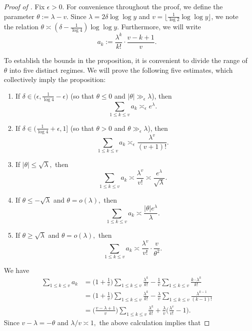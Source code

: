 \documentclass{amsart}
\theoremstyle{definition}
\numberwithin{equation}{section}
\newcommand{\density}{\delta}
\begin{document}
	\begin{proof}[Proof of ]
		Fix $\epsilon > 0$. For convenience throughout the proof, we define the parameter $\theta := \lambda - v$. Since $\lambda = 2\density \log \log y$ and $v = \lfloor\frac{1}{\log 2}\log \log y\rfloor$, we note the relation $\theta \asymp (\density - \frac{1}{\log 4})\log \log y$. Furthermore, we will write
		$$a_k := \frac{\lambda^k}{k!}\cdot \frac{v-k+1}{v}.$$
		
		To establish the bounds in the proposition, it is convenient to divide the range of $\theta$ into five distinct regimes. We will prove the following five estimates, which collectively imply the proposition:
		\begin{enumerate}[label=(\roman*)]
			\item If $\density \in \big(\epsilon,\frac{1}{\log 4} - \epsilon\big)$ (so that $\theta \leq 0$ and $|\theta| \gg_\epsilon \lambda$), then $$\sum_{1 \leq k \leq v} a_k \asymp_{\epsilon} e^\lambda.$$
			\item If $\density \in \big(\frac{1}{\log 4} + \epsilon,1\big]$ (so that $\theta > 0$ and $\theta \gg_\epsilon \lambda$), then $$\sum_{1 \leq k \leq v} a_k \asymp_{\epsilon} \frac{\lambda^v}{(v+1)!}.$$
			\item If $|\theta|  \le \sqrt{\lambda},$ then $$\sum_{1 \leq k \leq v} a_k \asymp \frac{\lambda^v}{v!} \asymp \frac{e^\lambda}{\sqrt{\lambda}}.$$
			\item If $\theta \leq -\sqrt{\lambda}$ and $\theta = o(\lambda),$ then $$\sum_{1 \leq k \leq v} a_k \asymp \frac{|\theta| e^\lambda}{\lambda}.$$
			\item If $\theta \geq \sqrt{\lambda}$ and $\theta = o(\lambda),$ then $$\sum_{1 \leq k \leq v} a_k \asymp \frac{\lambda^v}{v!} \cdot \frac{v}{\theta^2}.$$
		\end{enumerate}
	We have
	\begin{align*}
		\sum_{1 \leq k \leq v}a_k &=\bigg(1+\frac{1}{v}\bigg)\sum_{1 \leq k \leq v} \frac{\lambda^k}{k!} - \frac{1}{v}\sum_{1 \leq k \leq v}\frac{k\cdot\lambda^{k}}{k!}\\ &=\bigg(1+\frac{1}{v}\bigg)\sum_{1 \leq k \leq v} \frac{\lambda^k}{k!} - \frac{\lambda}{v}\sum_{1 \leq k \leq v}\frac{\lambda^{k-1}}{(k-1)!}\\
		&= \bigg(\frac{v-\lambda+1}{v}\bigg)\sum_{1 \leq k \leq v} \frac{\lambda^k}{k!} + \frac{\lambda}{v}\bigg(\frac{\lambda^{v}}{v!}-1\bigg).
	\end{align*}
	Since $v-\lambda = - \theta$ and $\lambda/v \asymp 1,$ the above calculation implies that

\end{proof}
\end{document}
